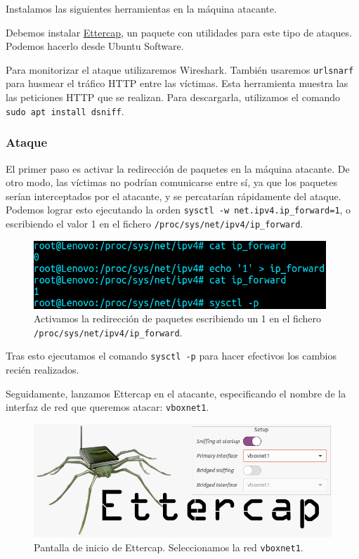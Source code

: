 \documentclass[11pt]{article}
\begin{document}
Instalamos las siguientes herramientas en la máquina atacante.

Debemos instalar \href{https://www.ettercap-project.org}{Ettercap}, un paquete con utilidades para este tipo de ataques.
Podemos hacerlo desde Ubuntu Software.

Para monitorizar el ataque utilizaremos Wireshark. También usaremos \texttt{urlsnarf} para husmear el tráfico HTTP entre las víctimas. Esta
herramienta muestra las las peticiones HTTP que se realizan. Para descargarla, utilizamos el comando \verb^sudo apt install dsniff^.

\subsubsection*{Ataque}

El primer paso es activar la redirección de paquetes en la máquina atacante. De otro modo, las víctimas no podrían comunicarse entre sí, ya
que los paquetes serían interceptados por el atacante, y se percatarían rápidamente del ataque. Podemos lograr esto ejecutando la orden
\verb|sysctl -w net.ipv4.ip_forward=1|, o escribiendo el valor 1 en el fichero \texttt{/proc/sys/net/ipv4/ip\_forward}.

\begin{figure}[H]
	\centering
	\includegraphics[width=110mm]{images/ip_forward}
	\caption{Activamos la redirección de paquetes escribiendo un 1 en el fichero \texttt{/proc/sys/net/ipv4/ip\_forward}.}
	\label{fig:ip_forward}
\end{figure}

Tras esto ejecutamos el comando \verb|sysctl -p| para hacer efectivos los cambios recién realizados.

Seguidamente, lanzamos Ettercap en el atacante, especificando el nombre de la interfaz de red que queremos atacar: \texttt{vboxnet1}.

\begin{figure}[H]
	\centering
	\includegraphics[width=140mm]{images/ettercap-start}
	\caption{Pantalla de inicio de Ettercap. Seleccionamos la red \texttt{vboxnet1}.}
	\label{fig:ettercap-start}
\end{figure}
\end{document}

